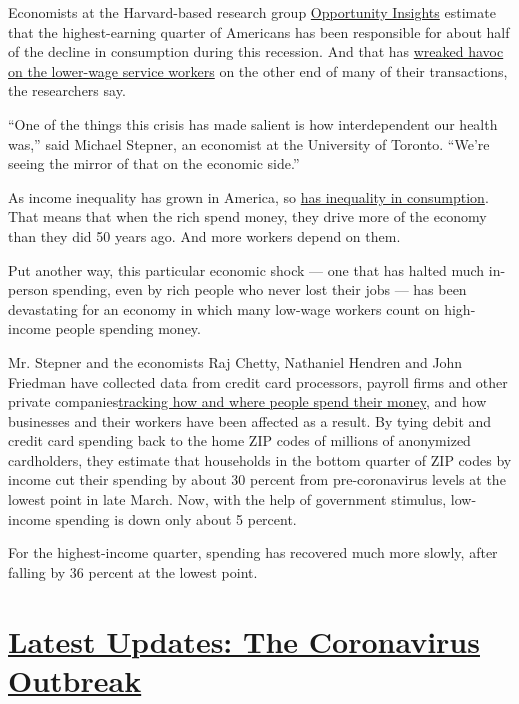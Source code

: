 Economists at the Harvard-based research group
\href{https://opportunityinsights.org/}{Opportunity Insights} estimate
that the highest-earning quarter of Americans has been responsible for
about half of the decline in consumption during this recession. And that
has \href{https://opportunityinsights.org/paper/tracker/}{wreaked havoc
on the lower-wage service workers} on the other end of many of their
transactions, the researchers say.

``One of the things this crisis has made salient is how interdependent
our health was,'' said Michael Stepner, an economist at the University
of Toronto. ``We're seeing the mirror of that on the economic side.''

As income inequality has grown in America, so
\href{https://pubs.aeaweb.org/doi/pdfplus/10.1257/jep.30.2.3}{has
inequality in consumption}. That means that when the rich spend money,
they drive more of the economy than they did 50 years ago. And more
workers depend on them.

Put another way, this particular economic shock --- one that has halted
much in-person spending, even by rich people who never lost their jobs
--- has been devastating for an economy in which many low-wage workers
count on high-income people spending money.

Mr. Stepner and the economists Raj Chetty, Nathaniel Hendren and John
Friedman have collected data from credit card processors, payroll firms
and other private
companies\href{https://tracker.opportunityinsights.org/}{tracking how
and where people spend their money}, and how businesses and their
workers have been affected as a result. By tying debit and credit card
spending back to the home ZIP codes of millions of anonymized
cardholders, they estimate that households in the bottom quarter of ZIP
codes by income cut their spending by about 30 percent from
pre-coronavirus levels at the lowest point in late March. Now, with the
help of government stimulus, low-income spending is down only about 5
percent.

For the highest-income quarter, spending has recovered much more slowly,
after falling by 36 percent at the lowest point.

\hypertarget{latest-updates-the-coronavirus-outbreak}{%
\section{\texorpdfstring{\href{https://www.nytimes3xbfgragh.onion/2020/08/21/world/covid-19-coronavirus.html?action=click\&pgtype=Article\&state=default\&region=MAIN_CONTENT_1\&context=storylines_live_updates}{Latest
Updates: The Coronavirus
Outbreak}}{Latest Updates: The Coronavirus Outbreak}}\label{latest-updates-the-coronavirus-outbreak}}

